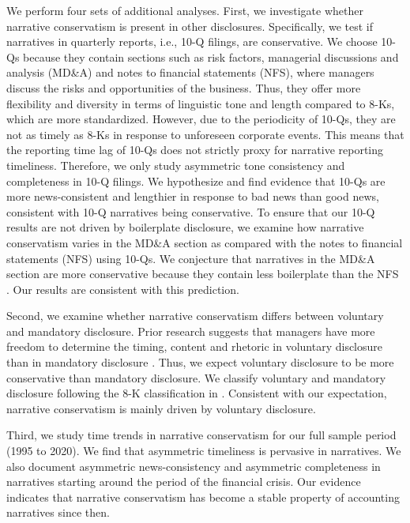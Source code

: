 \documentclass[letterpaper,12pt]{article}
\begin{document}
\begin{spacing}{1.5}
We perform four sets of additional analyses. First, we investigate whether narrative conservatism is present in other disclosures. Specifically, we test if narratives in quarterly reports, i.e., 10-Q filings, are conservative. We choose 10-Qs because they contain sections such as risk factors, managerial discussions and analysis (MD\&A) and notes to financial statements (NFS), where managers discuss the risks and opportunities of the business. Thus, they offer more flexibility and diversity in terms of linguistic tone and length compared to 8-Ks, which are more standardized. However, due to the periodicity of 10-Qs, they are not as timely as 8-Ks in response to unforeseen corporate events. This means that the reporting time lag of 10-Qs does not strictly proxy for narrative reporting timeliness. Therefore, we only study asymmetric tone consistency and completeness in 10-Q filings. We hypothesize and find evidence that 10-Qs are more news-consistent and lengthier in response to bad news than good news, consistent with 10-Q narratives being conservative. To ensure that our 10-Q results are not driven by boilerplate disclosure, we examine how narrative conservatism varies in the MD\&A section as compared with the notes to financial statements (NFS) using 10-Qs. We conjecture that narratives in the MD\&A section are more conservative because they contain less boilerplate than the NFS \cite{secFinancialReportingManual2019}. Our results are consistent with this prediction. 

Second, we examine whether narrative conservatism differs between voluntary and mandatory disclosure. Prior research suggests that managers have more freedom to determine the timing, content and rhetoric in voluntary disclosure than in mandatory disclosure \cite{segalAreManagersStrategic2016}. Thus, we expect voluntary disclosure to be more conservative than mandatory disclosure. We classify voluntary and mandatory disclosure following the 8-K classification in . Consistent with our expectation, narrative conservatism is mainly driven by voluntary disclosure. 

Third, we study time trends in narrative conservatism for our full sample period (1995 to 2020). We find that asymmetric timeliness is pervasive in narratives. We also document asymmetric news-consistency and asymmetric completeness in narratives starting around the period of the financial crisis. Our evidence indicates that narrative conservatism has become a stable property of accounting narratives since then.


\end{spacing}
\end{document}

